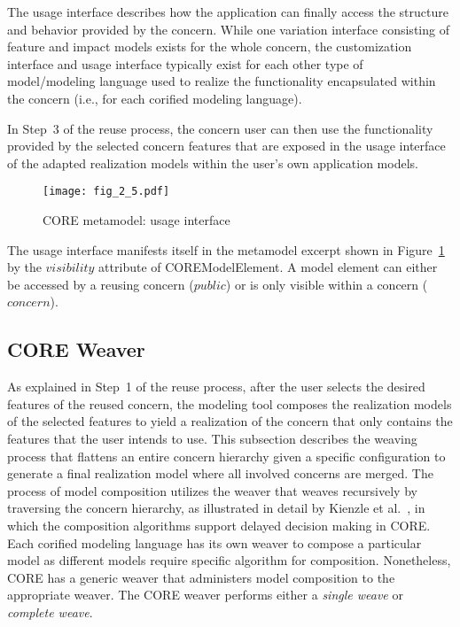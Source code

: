 The usage interface describes how the application can finally access the structure and behavior provided by the concern. While one variation interface consisting of feature and impact models exists for the whole concern, the customization interface and usage interface typically exist for each other type of model/modeling language used to realize the functionality encapsulated within the concern (i.e., for each corified modeling language).

In Step~3 of the reuse process, the concern user can then use the functionality provided by the selected concern features that are exposed in the usage interface of the adapted realization models within the user's own application models.

\begin{figure}
	\centering
	\texttt{[image: fig\_2\_5.pdf]}
	\caption{CORE metamodel: usage interface}
	\label{fig:2.5}
\end{figure}

The usage interface manifests itself in the metamodel excerpt shown in Figure~\ref{fig:2.5} by the $visibility$ attribute of {\cls COREModelElement}. A model element can either be accessed by a reusing concern ($public$) or is only visible within a concern ($concern$).

\subsection{CORE Weaver}

As explained in Step~1 of the reuse process, after the user selects the desired features of the reused concern, the modeling tool composes the realization models of the selected features to yield a realization of the concern that only contains the features that the user intends to use. This subsection describes the weaving process that flattens an entire concern hierarchy given a specific configuration to generate a final realization model where all involved concerns are merged. The process of model composition utilizes the weaver that weaves recursively by traversing the concern hierarchy, as illustrated in detail by Kienzle et al.~\cite{kienzle2016delaying}, in which the composition algorithms support delayed decision making in CORE. Each corified modeling language has its own weaver to compose a particular model as different models require specific algorithm for composition. Nonetheless, CORE has a generic weaver that administers model composition to the appropriate weaver. The CORE weaver performs either a \emph{single weave} or \emph{complete weave}.

